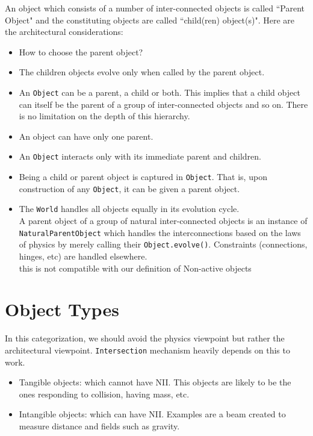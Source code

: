 \documentclass[a4paper]{report}
\newcommand{\cm}[1]{{\color{red}#1}}
\newcommand{\ai}[1]{{\color{blue}#1}}
\begin{document}
An object which consists of a number of inter-connected objects is called ``Parent Object" and the constituting objects are called ``child(ren) object(s)". Here are the architectural considerations:
\begin{itemize}
	\item \ai{How to choose the parent object?}
	\item The children objects evolve only when called by the parent object. 
	\item An \verb+Object+ can be a parent, a child or both. This implies that a child object can itself be the parent of a group of inter-connected objects and so on. There is no limitation on the depth of this hierarchy.
	\item An object can have only one parent.
	\item An \verb+Object+ interacts only with its immediate parent and children.
	\item Being a child or parent object is captured in \verb+Object+. That is, upon construction of any \verb+Object+, it can be given a parent object. 
	\item The \verb+World+ handles all objects equally in its evolution cycle.\\
	\cm{ A parent object of a group of natural inter-connected objects is an instance of} \verb+NaturalParentObject+ \cm{ which handles the interconnections based on the laws of physics by merely calling their}  \verb+Object.evolve()+. \cm{ Constraints (connections, hinges, etc) are handled elsewhere. }\\
	\ai{this is not compatible with our definition of Non-active objects}
\end{itemize}

\section{Object Types}
In this categorization, we should avoid the physics viewpoint but rather the architectural viewpoint. \verb+Intersection+ mechanism heavily depends on this to work.
\begin{itemize}
	\item Tangible objects: which cannot have NII. This objects are likely to be the ones responding to collision, having mass, etc.

	\item Intangible objects: which can have NII. Examples are a beam created to measure distance and fields such as gravity.
\end{itemize}
\end{document}
